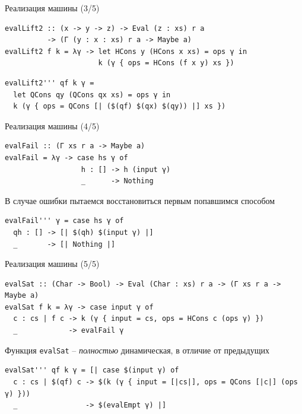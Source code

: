 \begin{frame}[fragile]{Реализация машины (3/5)}
\begin{verbatim}
evalLift2 :: (x -> y -> z) -> Eval (z : xs) r a 
          -> (Γ (y : x : xs) r a -> Maybe a)
evalLift2 f k = λγ -> let HCons y (HCons x xs) = ops γ in 
                      k (γ { ops = HCons (f x y) xs })
\end{verbatim}
\newln
\begin{verbatim}
evalLift2''' qf k γ = 
  let QCons qy (QCons qx xs) = ops γ in 
  k (γ { ops = QCons [| ($(qf) $(qx) $(qy)) |] xs })
\end{verbatim}

\end{frame}



\begin{frame}[fragile]{Реализация машины (4/5)}
\begin{verbatim}
evalFail :: (Γ xs r a -> Maybe a)
evalFail = λγ -> case hs γ of 
                  h : [] -> h (input γ)
                  _      -> Nothing
\end{verbatim}
В случае ошибки пытаемся восстановиться первым попавшимся способом
\begin{verbatim}
evalFail''' γ = case hs γ of 
  qh : [] -> [| $(qh) $(input γ) |]
  _       -> [| Nothing |]
\end{verbatim}
\end{frame}

\begin{frame}[fragile]{Реализация машины (5/5)}
\begin{verbatim}
evalSat :: (Char -> Bool) -> Eval (Char : xs) r a -> (Γ xs r a -> Maybe a)
evalSat f k = λγ -> case input γ of
  c : cs | f c -> k (γ { input = cs, ops = HCons c (ops γ) })
  _            -> evalFail γ
\end{verbatim}
\vspace{2em}
Функция \texttt{evalSat} -- \emph{полностью} динамическая, в отличие от предыдущих
\begin{verbatim}
evalSat''' qf k γ = [| case $(input γ) of
  c : cs | $(qf) c -> $(k (γ { input = [|cs|], ops = QCons [|c|] (ops γ) }))
  _                -> $(evalEmpt γ) |]
\end{verbatim}
\end{frame}


